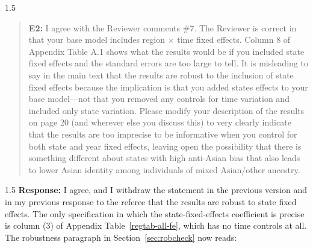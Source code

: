 \documentclass[12pt,english]{article}
\newcommand{\rrxspc}{1.5}
\begin{document}
\begin{refsection}
    \begin{spacing}{\rrxspc}
            \begin{quotation}
                \textbf{E2: } I agree with the Reviewer comments \#7. The Reviewer is correct in that your base model includes region $\times$ time fixed effects. Column 8 of Appendix Table A.1 shows what the results would be if you included state fixed effects and the standard errors are too large to tell. It is misleading to say in the main text that the results are robust to the inclusion of state fixed effects because the implication is that you added states effects to your base model---not that you removed any controls for time variation and included only state variation. Please modify your description of the results on page 20 (and wherever else you discuss this) to very clearly indicate that the results are too imprecise to be informative when you control for both state and year fixed effects, leaving open the possibility that there is something different about states with high anti-Asian bias that also leads to lower Asian identity among individuals of mixed Asian/other ancestry.
            \end{quotation}
        \end{spacing}
        \begin{spacing}{\rrxspc}
        \textbf{Response:} I agree, and I withdraw the statement in the previous version and in my previous response to the referee that the results are robust to state fixed effects. The only specification in which the state-fixed-effects coefficient is precise is column (3) of Appendix Table~\ref{regtab-all-fe}, which has no time controls at all. The robustness paragraph in Section~\ref{sec:robcheck} now reads:

\end{spacing}
\end{refsection}
\end{document}
